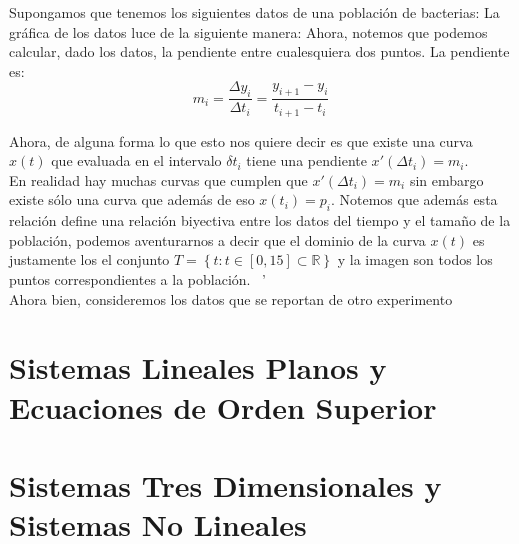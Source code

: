 \documentclass[11pt,fleqn]{book} %
\begin{document}
Supongamos que tenemos los siguientes datos de una población de bacterias:
La gráfica de los datos luce de la siguiente manera:
Ahora, notemos que podemos calcular, dado los datos, la pendiente entre cualesquiera
dos puntos. La pendiente es:
\begin{equation}
    m_{i} = \displaystyle\frac{\Delta y_{i}}{\Delta t_{i}} = \frac{y_{i+1}-y_{i}}{t_{i+1}-t_{i}}
\end{equation}


Ahora, de alguna forma lo que esto nos quiere decir es que existe una curva $x(t)$ que evaluada en el intervalo $\delta t_{i}$ tiene una pendiente $x'(\Delta t_{i}) = m_{i} $. 
\ \\
\noindent
En realidad hay muchas curvas que cumplen que $x'(\Delta t_{i}) = m_{i}$ sin embargo existe sólo una curva que además de eso $x(t_{i}) = p_{i}$. Notemos que además esta relación define una relación biyectiva entre los datos del tiempo y el tamaño de la población, podemos aventurarnos a decir que el dominio de la curva $x(t)$ es justamente los el conjunto $T = \left\{ t : t \in [0,15]\subset \mathbb{R}\right\}$ y la imagen son todos los puntos correspondientes a la población. 
\ '\\
\noindent
Ahora bien, consideremos los datos que se reportan de otro experimento








\chapter{Sistemas Lineales Planos y Ecuaciones de Orden Superior}


\chapter{Sistemas Tres Dimensionales y Sistemas No Lineales}

\end{document}
